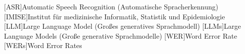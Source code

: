 \begin{acronym}[SPARQL]
[ASR]{Automatic Speech Recognition (Automatische Spracherkennung)}
[IMISE]{Institut für medizinische Informatik, Statistik und Epidemiologie}
[LLM]{Large Language Model (Großes generatives Sprachmodell)}
[LLMs]{Large Language Models (Große generative Sprachmodelle)}
[WER]{Word Error Rate}
[WERs]{Word Error Rates}
\end{acronym}
